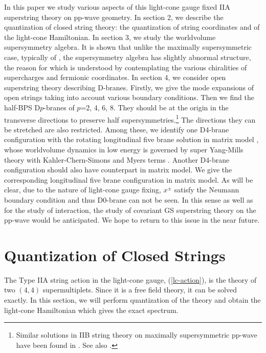\documentclass[a4paper,12pt]{article}
\begin{document}
In this paper we study various aspects of this light-cone gauge fixed
IIA superstring theory on pp-wave geometry.  In section 2, we describe
the quantization of closed string theory: the quantization of string
coordinates and of the light-cone Hamiltonian.  In section 3, we study
the worldvolume supersymmetry algebra.  It is shown that unlike the
maximally supersymmetric case, typically of \cite{met044}, the
supersymmetry algebra has slightly abnormal structure, the reason for
which is understood by contemplating the various chiralities of
supercharges and fermionic coordinates.  In section 4, we consider
open superstring theory describing D-branes. Firstly, we give the mode
expansions of open strings taking into account various boundary
conditions.  Then we find the half-BPS D$p$-branes of $p$=2, 4, 6,
8. They should be at the origin in the transverse directions to
preserve half supersymmetries.\footnote{Similar solutions in IIB
string theory on maximally supersymmetric pp-wave have been found in
\cite{dab231,ske054,bil028,bai038}. See also \cite{kum025,ali134}.}
The directions they can be stretched are also restricted.  Among
these, we identify one D4-brane configuration with the rotating
longitudinal five brane solution in matrix model \cite{hyu090}, whose
worldvolume dynamics in low energy is governed by super Yang-Mills
theory with Kahler-Chern-Simons and Myers terms \cite{hyu219}. Another
D4-brane configuration should also have counterpart in matrix
model. We give the corresponding longitudinal five brane configuration
in matrix model.  As will be clear, due to the nature of light-cone
gauge fixing, $x^{\pm}$ satisfy the Neumann boundary condition and
thus D0-brane can not be seen.  In this sense as well as for the study
of interaction, the study of covariant GS superstring theory on the
pp-wave would be anticipated. We hope to return to this issue in the
near future.




\section{Quantization of Closed Strings}

The Type IIA string action in the light-cone gauge, (\ref{lc-action}),
is the theory of two $(4,4)$ supermultiplets.  Since it is a free
field theory, it can be solved exactly.  In this section, we will
perform quantization of the theory and obtain the light-cone
Hamiltonian which gives the exact spectrum.
\end{document}
